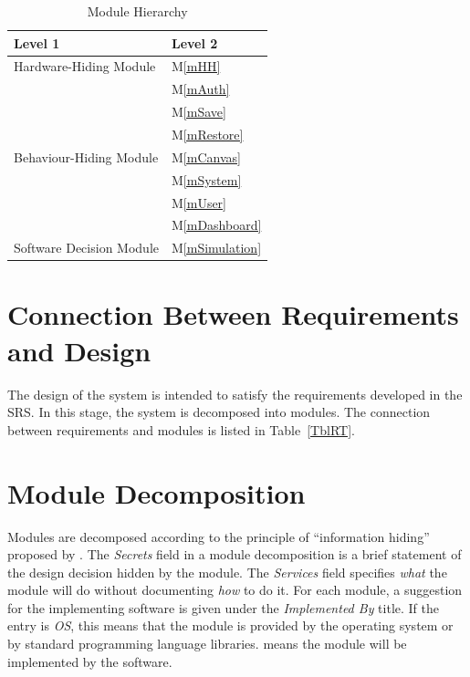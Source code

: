 \documentclass[12pt, titlepage]{article}
\newcommand{\mref}[1]{M\ref{#1}}
\begin{document}
\begin{table}[h!]
\centering
\begin{tabular}{p{} p{}}
\toprule
\textbf{Level 1} & \textbf{Level 2}\\
\midrule

{Hardware-Hiding Module} & \mref{mHH} \\
\midrule

\multirow{7}{0.3\textwidth}{Behaviour-Hiding Module} & \mref{mAuth}\\
& \mref{mSave}\\
& \mref{mRestore}\\
& \mref{mCanvas}\\
& \mref{mSystem}\\
& \mref{mUser}\\
& \mref{mDashboard}\\

\midrule

\multirow{1}{0.3\textwidth}{Software Decision Module} & \mref{mSimulation}\\

\bottomrule

\end{tabular}
\caption{Module Hierarchy}
\label{TblMH}
\end{table}

\section{Connection Between Requirements and Design} \label{SecConnection}

The design of the system is intended to satisfy the requirements developed in
the SRS. In this stage, the system is decomposed into modules. The connection
between requirements and modules is listed in Table~\ref{TblRT}.

\section{Module Decomposition} \label{SecMD}

Modules are decomposed according to the principle of ``information hiding''
proposed by \citet{ParnasEtAl1984}. The \emph{Secrets} field in a module
decomposition is a brief statement of the design decision hidden by the
module. The \emph{Services} field specifies \emph{what} the module will do
without documenting \emph{how} to do it. For each module, a suggestion for the
implementing software is given under the \emph{Implemented By} title. If the
entry is \emph{OS}, this means that the module is provided by the operating
system or by standard programming language libraries.  \emph{\progname{}} means the
module will be implemented by the \progname{} software.
\end{document}
